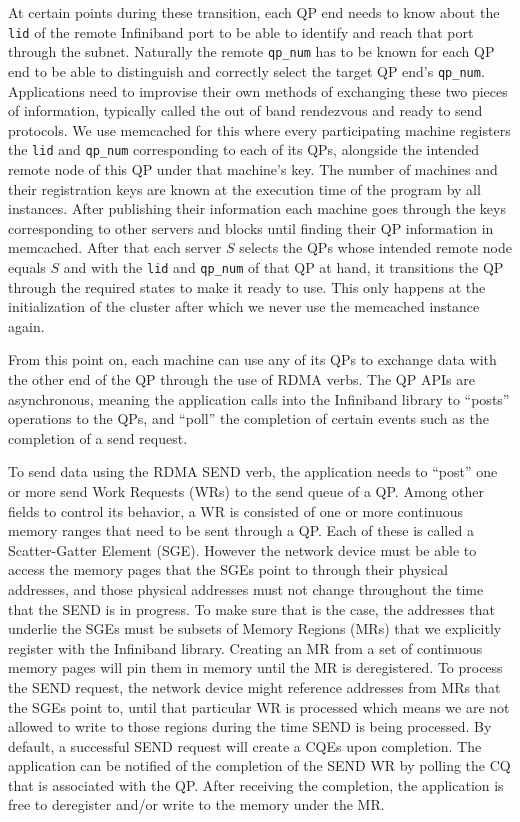 At certain points during these transition, each
QP end needs to know about the \texttt{lid} of the remote Infiniband port to
be able to identify and reach that port through the subnet. Naturally the
remote \texttt{qp\_num} has to be known for each QP end to be able to
distinguish and correctly select the target QP end's \texttt{qp\_num}.
Applications need to improvise their own methods of exchanging these two
pieces of information, typically called the out of band rendezvous and ready to
send protocols. We use memcached for this where every participating machine
registers the \texttt{lid} and \texttt{qp\_num} corresponding to each of its
QPs, alongside the intended remote node of this QP under that machine's key.
The number of machines and their registration keys
are known at the execution time of the program by all instances. After
publishing their information each machine goes through the keys corresponding
to other servers and blocks until finding their QP information in memcached.
After that each server $S$ selects the QPs whose intended remote node equals
$S$ and with the \texttt{lid} and \texttt{qp\_num} of that QP at hand, it
transitions the QP through the required states to make it ready to use. This
only happens at the initialization of the cluster after which we never use
the memcached instance again.

From this point on, each machine can use any of its QPs to exchange data with
the other end of the QP through the use of RDMA verbs. The QP APIs are
asynchronous, meaning the application calls into the Infiniband library to
``posts'' operations to the QPs, and ``poll'' the completion of certain events
such as the completion of a send request.

To send data using the RDMA SEND verb, the application needs to ``post'' one
or more send Work Requests (WRs) to the send queue of a QP. Among other fields
to control its behavior, a WR is consisted of one or more
continuous memory ranges that need to be sent through a QP. Each of these
is called a Scatter-Gatter Element (SGE). However the network device must be
able to access the memory pages that the SGEs point to through their physical
addresses, and those physical addresses must not change throughout the time
that the SEND is in progress. To make sure that is the case, the addresses
that underlie the SGEs must be subsets of Memory Regions (MRs) that we
explicitly register with the Infiniband library. Creating an MR from a set of
continuous memory pages will pin them in memory until the MR is
deregistered. To process the SEND request, the network device might reference
addresses from MRs that the SGEs point to, until that particular WR is
processed which means we are not allowed to write to those regions during
the time SEND is being processed. By default, a successful SEND request will
create a CQEs upon completion. The application can be notified of the completion
of the SEND WR by polling the CQ that is associated with the QP. After receiving
the completion, the application is free to deregister and/or write to the
memory under the MR.

